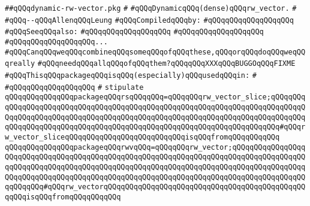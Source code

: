\label{src/lib/src/dynamic-rw-vector.pkg}
\verb|##qQQqdynamic-rw-vector.pkg|\newline
\verb|#|\newline
\verb|#qQQqDynamicqQQq(dense)qQQqrw_vector.|\newline
\verb|#|\newline
\verb|#qQQq--qQQqAllenqQQqLeung|\newline
\newline
\verb|#qQQqCompiledqQQqby:|\newline
\verb|#qQQqqQQqqQQqqQQqqQQq|\newline
\newline
\newline
\verb|#qQQqSeeqQQqalso:|\newline
\verb|#qQQqqQQqqQQqqQQqqQQq|\newline
\verb|#qQQqqQQqqQQqqQQqqQQq|\newline
\verb|#qQQqqQQqqQQqqQQqqQQq...|\newline
\verb|#qQQqCanqQQqweqQQqcombineqQQqsomeqQQqofqQQqthese,qQQqorqQQqdoqQQqweqQQqreally|\newline
\verb|#qQQqneedqQQqallqQQqofqQQqthem?qQQqqQQqXXXqQQqBUGGOqQQqFIXME|\newline
\newline
\verb|#qQQqThisqQQqpackageqQQqisqQQq(especially)qQQqusedqQQqin:|\newline
\verb|#|\newline
\verb|#qQQqqQQqqQQqqQQqqQQq|\newline
\verb|#|\newline
\newline
\verb|stipulate|\newline
\verb|qQQqqQQqqQQqqQQqpackageqQQqrsqQQqqQQq=qQQqqQQqrw_vector_slice;qQQqqQQqqQQqqQQqqQQqqQQqqQQqqQQqqQQqqQQqqQQqqQQqqQQqqQQqqQQqqQQqqQQqqQQqqQQqqQQqqQQqqQQqqQQqqQQqqQQqqQQqqQQqqQQqqQQqqQQqqQQqqQQqqQQqqQQqqQQqqQQqqQQqqQQqqQQqqQQqqQQqqQQqqQQqqQQqqQQqqQQqqQQqqQQqqQQqqQQqqQQqqQQqqQQq#qQQqrw_vector_sliceqQQqqQQqqQQqqQQqqQQqqQQqqQQqisqQQqfromqQQqqQQqqQQq|\newline
\verb|qQQqqQQqqQQqqQQqpackageqQQqrwvqQQq=qQQqqQQqrw_vector;qQQqqQQqqQQqqQQqqQQqqQQqqQQqqQQqqQQqqQQqqQQqqQQqqQQqqQQqqQQqqQQqqQQqqQQqqQQqqQQqqQQqqQQqqQQqqQQqqQQqqQQqqQQqqQQqqQQqqQQqqQQqqQQqqQQqqQQqqQQqqQQqqQQqqQQqqQQqqQQqqQQqqQQqqQQqqQQqqQQqqQQqqQQqqQQqqQQqqQQqqQQqqQQqqQQqqQQqqQQqqQQqqQQqqQQqqQQq#qQQqrw_vectorqQQqqQQqqQQqqQQqqQQqqQQqqQQqqQQqqQQqqQQqqQQqqQQqqQQqisqQQqfromqQQqqQQqqQQq|\newline
